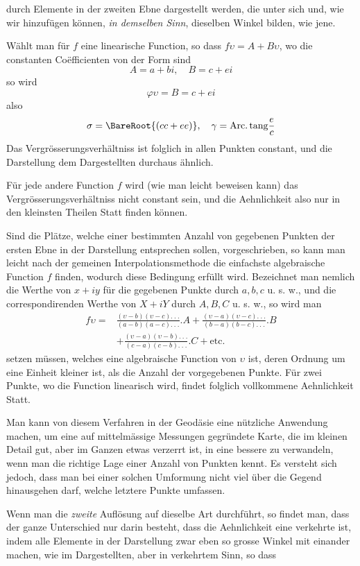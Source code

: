 durch Elemente in der zweiten Ebne dargestellt werden, die unter sich und, wie wir hinzufügen können, \textit{in demselben Sinn}, dieselben Winkel bilden, wie jene.

Wählt man für \(f\) eine linearische Function, so dass \(f\upsilon=A+B\upsilon\), wo die constanten Coëfficienten von der Form sind
\[
A=a+bi,\quad B=c+ei
\]
\noindent so wird
\[
\varphi\upsilon=B=c+ei
\]
\noindent also
\[
\sigma=\BareRoot{(cc+ee)},\quad\gamma=\mathrm{Arc.}\,\mathrm{tang}\frac{e}{c}
\]
\noindent Das Vergrösserungsverhältniss ist folglich in allen Punkten constant, und die Darstellung dem Dargestellten durchaus ähnlich.

Für jede andere Function \(f\) wird (wie man leicht beweisen kann) das Vergrösserungsverhältniss nicht constant sein, und die Aehnlichkeit also nur in den kleinsten Theilen Statt finden können.

Sind die Plätze, welche einer bestimmten Anzahl von gegebenen Punkten der ersten Ebne in der Darstellung entsprechen sollen, vorgeschrieben, so kann man leicht nach der gemeinen Interpolationsmethode die einfachste algebraische Function \(f\) finden, wodurch diese Bedingung erfüllt wird. Bezeichnet man nemlich die Werthe von \(x+iy\) für die gegebenen Punkte durch \(a,b,c\) u. s. w., und die correspondirenden Werthe von \(X+iY\) durch \(A,B,C\) u. s. w., so wird man
\[
\begin{aligned}
f\upsilon={}&\frac{(\upsilon-b)(\upsilon-c).\ .\ .}{(a-b)(a-c).\ .\ .}\mathord{.}A
+\frac{(\upsilon-a)(\upsilon-c).\ .\ .}{(b-a)(b-c).\ .\ .}\mathord{.}B\\
&+\frac{(\upsilon-a)(\upsilon-b).\ .\ .}{(c-a)(c-b).\ .\ .}\mathord{.}C+\text{etc.}
\end{aligned}
\]
\noindent setzen müssen, welches eine algebraische Function von \(\upsilon\) ist, deren Ordnung um eine Einheit kleiner ist, als die Anzahl der vorgegebenen Punkte. Für zwei Punkte, wo die Function linearisch wird, findet folglich vollkommene Aehnlichkeit Statt.

Man kann von diesem Verfahren in der Geodäsie eine nützliche Anwendung machen, um eine auf mittelmässige Messungen gegründete Karte, die im kleinen Detail gut, aber im Ganzen etwas verzerrt ist, in eine bessere zu verwandeln, wenn man die richtige Lage einer Anzahl von Punkten kennt. Es versteht sich jedoch, dass man bei einer solchen Umformung nicht viel über die Gegend hinausgehen darf, welche letztere Punkte umfassen.

Wenn man die \textit{zweite} Auflösung auf dieselbe Art durchführt, so findet man, dass der ganze Unterschied nur darin besteht, dass die Aehnlichkeit eine verkehrte ist, indem alle Elemente in der Darstellung zwar eben so grosse Winkel mit einander machen, wie im Dargestellten, aber in verkehrtem Sinn, so dass
